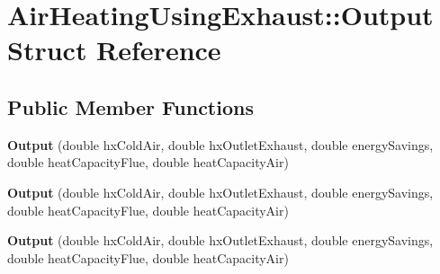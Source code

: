 \hypertarget{struct_air_heating_using_exhaust_1_1_output}{}\section{Air\+Heating\+Using\+Exhaust\+:\+:Output Struct Reference}
\label{struct_air_heating_using_exhaust_1_1_output}
\subsection*{Public Member Functions}
\begin{DoxyCompactItemize}
\item 
\mbox{\label{struct_air_heating_using_exhaust_1_1_output_a02d8825fed78970a09f4aa41de0f7eb4}} 
{\bfseries Output} (double hx\+Cold\+Air, double hx\+Outlet\+Exhaust, double energy\+Savings, double heat\+Capacity\+Flue, double heat\+Capacity\+Air)
\item 
\mbox{\label{struct_air_heating_using_exhaust_1_1_output_a02d8825fed78970a09f4aa41de0f7eb4}} 
{\bfseries Output} (double hx\+Cold\+Air, double hx\+Outlet\+Exhaust, double energy\+Savings, double heat\+Capacity\+Flue, double heat\+Capacity\+Air)
\item 
\mbox{\label{struct_air_heating_using_exhaust_1_1_output_a02d8825fed78970a09f4aa41de0f7eb4}} 
{\bfseries Output} (double hx\+Cold\+Air, double hx\+Outlet\+Exhaust, double energy\+Savings, double heat\+Capacity\+Flue, double heat\+Capacity\+Air)
\end{DoxyCompactItemize}
